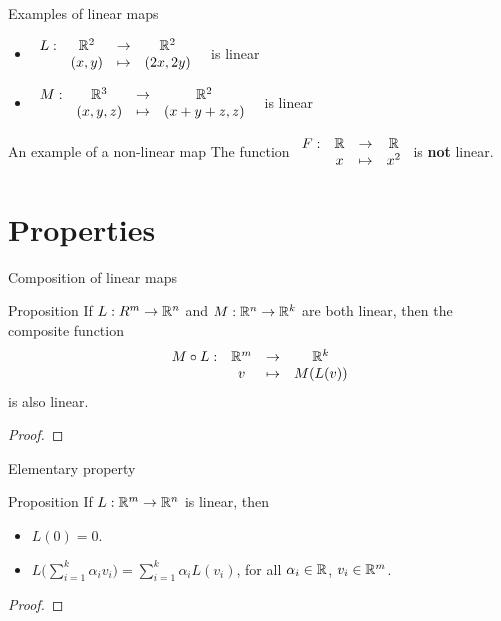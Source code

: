 \documentclass{beamer}
\begin{document}
\begin{frame}[t]{Examples of linear maps}
	\begin{itemize}
		\item $\displaystyle
			\begin{array}{cccc}
				L: & \mathbb{R}^2 & \to & \mathbb{R}^2 \\
				   & (x,y) & \mapsto & (2x,2y)
			\end{array}
			$
			\ is linear
			\vspace{2cm}
		\item
			$\displaystyle
			\begin{array}{cccc}
				M: & \mathbb{R}^3 & \to & \mathbb{R}^2 \\
				   & (x,y,z) & \mapsto & (x+y+z,z)
			\end{array}
			$
			\ is linear
	\end{itemize}
\end{frame}
\begin{frame}[t]{An example of a non-linear map}
		The function \quad $\displaystyle
			\begin{array}{cccc}
				F: & \mathbb{R} & \to & \mathbb{R} \\
				   & x & \mapsto & x^2
			\end{array}
			$
			\quad is \textbf{not} linear.
\end{frame}

\section{Properties}

\begin{frame}[t]{Composition of linear maps}
	\begin{block}{Proposition}
		If $L: R^m \to \mathbb{R}^n$ and $M: \mathbb{R}^n \to \mathbb{R}^k$ are both linear, then the composite function
		$$
			\begin{array}{cccc}
				M \circ L: & \mathbb{R}^m & \to & \mathbb{R}^k \\
						   & v & \mapsto & M(L(v))
			\end{array}
			$$
			is also linear.
	\end{block}
	\begin{proof}
		\vfill
		\vspace{2cm}
	\end{proof}
\end{frame}
\begin{frame}[t]{Elementary property}
	\begin{block}{Proposition}
		If $L: \mathbb{R}^m \to \mathbb{R}^n$ is linear, then
		\begin{itemize}
			\item $L(0) = 0$.
			\item $\displaystyle L\Big(\sum_{i=1}^k \alpha_i v_i \Big) = \sum_{i=1}^k \alpha_i L(v_i)$, for all $\alpha_i \in \mathbb{R}$, $v_i \in \mathbb{R}^m$.
		\end{itemize}
	\end{block}
	\begin{proof}
		\vfill
		\vspace{2cm}
	\end{proof}
\end{frame}
\end{document}
